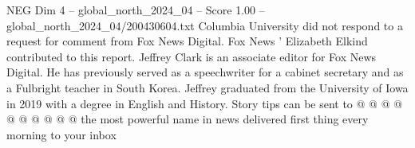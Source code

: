 \begin{textsample}{NEG Dim 4 – global\_north\_2024\_04 – Score 1.00 – global\_north\_2024\_04/200430604.txt}
Columbia University did not respond to a request for comment from Fox News Digital.
Fox News ' Elizabeth Elkind contributed to this report.
Jeffrey Clark is an associate editor for Fox News Digital.
He has previously served as a speechwriter for a cabinet secretary and as a Fulbright teacher in South Korea.
Jeffrey graduated from the University of Iowa in 2019 with a degree in English and History.
Story tips can be sent to @ @ @ @ @ @ @ @ @ @ the most powerful name in news delivered first thing every morning to your inbox

\end{textsample}
